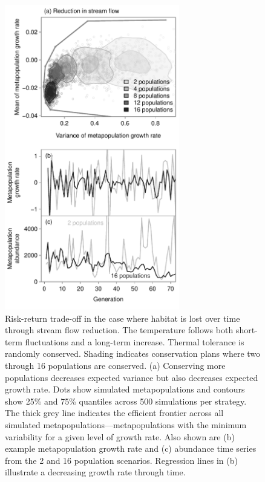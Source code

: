 \begin{figure}[htbp]
\includegraphics[width=3.0in]{metafolio/Fig6}
\centering
\caption[Risk-return trade-off in the case where habitat is lost over time through stream flow reduction.]{Risk-return trade-off in the case where habitat is lost over time through stream flow reduction. The temperature follows both short-term fluctuations and a long-term increase. Thermal tolerance is randomly conserved. Shading indicates conservation plans where two through 16 populations are conserved. (a) Conserving more populations decreases expected variance but also decreases expected growth rate. Dots show simulated metapopulations and contours show 25\% and 75\% quantiles across 500 simulations per strategy. The thick grey line indicates the efficient frontier across all simulated metapopulations---metapopulations with the minimum variability for a given level of growth rate. Also shown are (b) example metapopulation growth rate and (c) abundance time series from the 2 and 16 population scenarios. Regression lines in (b) illustrate a decreasing growth rate through time.} \label{f:squeeze}
\end{figure}

\clearpage

